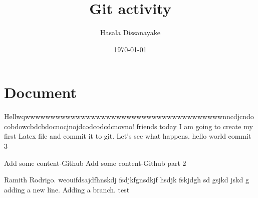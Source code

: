 \documentclass[a4 paper]{article}
\title{Git activity}
\author{Hasala Dissanayake}
\date{\today}
\begin{document}
\maketitle
\section{Document}

Hellwqwwwwwwwwwwwwwwwwwwwwwwwwwwwwwwwwwwwwwwwnncdjcndocobdowcbdcbdocnocjnojdcodcodcdcnovno! friends today I am going to create my first Latex file and commit it to git. Let's see what happens.
hello world
commit 3

Add some content-Github
Add some content-Github part 2

\newpage
Ramith Rodrigo. weouifdsajdfhnskdj fsdjkfgnsdkjf hsdjk fskjdgh sd gsjkd jskd g
adding a new line. Adding a branch. test
\end{document}
